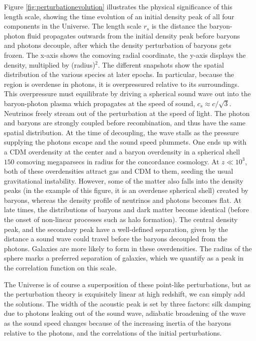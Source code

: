 \documentclass[a4paper,11pt]{article}
\begin{document}
{\noindent}Figure \ref{fig:perturbationevolution} illustrates the physical significance of this length scale, showing the time evolution of an initial density peak of all four components in the Universe. The length scale $r_s$ is the distance the baryon-photon fluid propagates outwards from the initial density peak before baryons and photons decouple, after which the density perturbation of baryons gets frozen. The x-axis shows the comoving radial coordinate, the y-axis displays the density, multiplied by (radius)$^2$. The different snapshots show the spatial distribution of the various species at later epochs. In particular, because the region is overdense in photons, it is overpressured relative to its surroundings. This overpressure must equilibrate by driving a spherical sound wave out into the baryon-photon plasma which propagates at the speed of sound, $c_s\approx c/\sqrt{3}$. Neutrinos freely stream out of the perturbation at the speed of light. The photon and baryons are strongly coupled before recombination, and thus have the same spatial distribution. At the time of decoupling, the wave stalls as the pressure supplying the photons escape and the sound speed plummets. One ends up with a CDM overdensity at the center and a baryon overdensity in a spherical shell $150$ comoving megaparsecs in radius for the concordance cosmology. At $z\ll10^3$, both of these overdensities attract gas and CDM to them, seeding the usual gravitational instability. However, some of the matter also falls into the density peaks (in the example of this figure, it is an overdense spherical shell) created by baryons, whereas the density profile of neutrinos and photons becomes flat. At late times, the distributions of baryons and dark matter become identical (before the onset of non-linear processes such as halo formation). The central density peak, and the secondary peak have a well-defined separation, given by the distance a sound wave could travel before the baryons decoupled from the photons. Galaxies are more likely to form in these overdensities. The radius of the sphere marks a preferred separation of galaxies, which we quantify as a peak in the correlation function on this scale.

{\noindent}The Universe is of course a superposition of these point-like perturbations, but as the perturbation theory is exquisitely linear at high redshift, we can simply add the solutions. The width of the acoustic peak is set by three factors: silk damping due to photons leaking out of the sound wave, adiabatic broadening of the wave as the sound speed changes because of the increasing inertia of the baryons relative to the photons, and the correlations of the initial perturbations.
\end{document}
